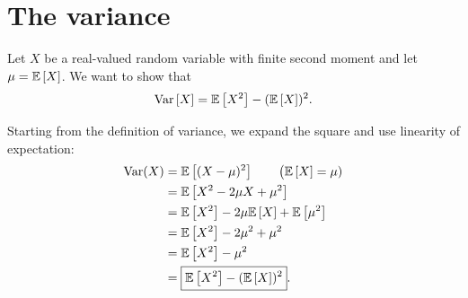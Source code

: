 \section{The variance}

Let \(X\) be a real-valued random variable with finite second moment
and let \(\mu=\E{X}\). We want to show that
\[
  \Var{X}=\E{X^2}-(\E{X})^2.
\]

Starting from the definition of variance, we expand the square
and use linearity of expectation:
\begin{align*}
  \operatorname{Var}(X)
  &= \E{(X-\mu)^2}
    \qquad  \bigl(\E{X}=\mu) \\
  &= \E{X^2-2\mu X+\mu^2} \\
  &= \E{X^2}-2\mu\E{X}+\E{\mu^2} \\
  &= \E{X^2}-2\mu^2+\mu^2 \\
  &= \E{X^2}-\mu^2 \\
  &= \boxed{\E{X^2}-(\E{X})^2}.
\end{align*}
